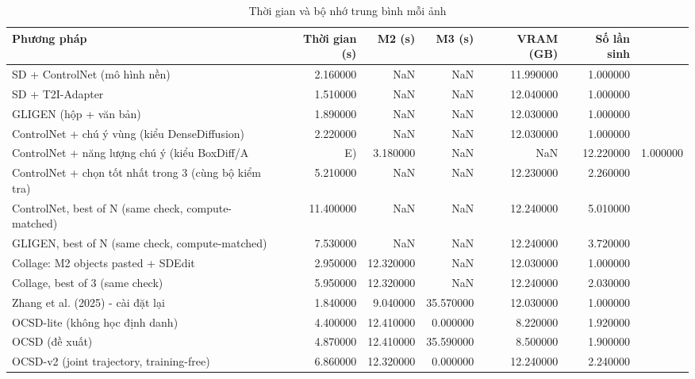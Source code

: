\begin{table}
\caption{Thời gian và bộ nhớ trung bình mỗi ảnh}
\begin{tabular}{lrrrrr}
\toprule
Phương pháp & Thời gian (s) & M2 (s) & M3 (s) & VRAM (GB) & Số lần sinh \\
\midrule
SD + ControlNet (mô hình nền) & 2.160000 & NaN & NaN & 11.990000 & 1.000000 \\
SD + T2I-Adapter & 1.510000 & NaN & NaN & 12.040000 & 1.000000 \\
GLIGEN (hộp + văn bản) & 1.890000 & NaN & NaN & 12.030000 & 1.000000 \\
ControlNet + chú ý vùng (kiểu DenseDiffusion) & 2.220000 & NaN & NaN & 12.030000 & 1.000000 \\
ControlNet + năng lượng chú ý (kiểu BoxDiff/A&E) & 3.180000 & NaN & NaN & 12.220000 & 1.000000 \\
ControlNet + chọn tốt nhất trong 3 (cùng bộ kiểm tra) & 5.210000 & NaN & NaN & 12.230000 & 2.260000 \\
ControlNet, best of N (same check, compute-matched) & 11.400000 & NaN & NaN & 12.240000 & 5.010000 \\
GLIGEN, best of N (same check, compute-matched) & 7.530000 & NaN & NaN & 12.240000 & 3.720000 \\
Collage: M2 objects pasted + SDEdit & 2.950000 & 12.320000 & NaN & 12.030000 & 1.000000 \\
Collage, best of 3 (same check) & 5.950000 & 12.320000 & NaN & 12.240000 & 2.030000 \\
Zhang et al. (2025) - cài đặt lại & 1.840000 & 9.040000 & 35.570000 & 12.030000 & 1.000000 \\
OCSD-lite (không học định danh) & 4.400000 & 12.410000 & 0.000000 & 8.220000 & 1.920000 \\
OCSD (đề xuất) & 4.870000 & 12.410000 & 35.590000 & 8.500000 & 1.900000 \\
OCSD-v2 (joint trajectory, training-free) & 6.860000 & 12.320000 & 0.000000 & 12.240000 & 2.240000 \\
\bottomrule
\end{tabular}
\end{table}
